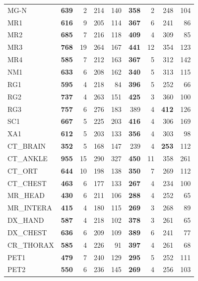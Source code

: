 \documentclass[journal]{IEEEtran}
\begin{document}
\begin{table}[htbp]
\begin{tabular}{l|rrrr|rrrr}
MG-N           & \textbf{639} & 2 & 214 & 140 & \textbf{358} & 2 & 248 & 104 \\
MR1            & \textbf{616} & 9 & 205 & 114 & \textbf{367} & 6 & 241 & 86 \\
MR2            & \textbf{685} & 7 & 216 & 118 & \textbf{409} & 4 & 309 & 85 \\
MR3            & \textbf{768} & 19 & 264 & 167 & \textbf{441} & 12 & 354 & 123 \\
MR4            & \textbf{585} & 7 & 212 & 163 & \textbf{367} & 5 & 312 & 142 \\
NM1            & \textbf{633} & 6 & 208 & 162 & \textbf{340} & 5 & 313 & 115 \\
RG1            & \textbf{595} & 4 & 218 & 84 & \textbf{396} & 5 & 252 & 66 \\
RG2            & \textbf{737} & 4 & 263 & 151 & \textbf{425} & 3 & 360 & 100 \\
RG3            & \textbf{757} & 6 & 276 & 183 & 389 & 4 & \textbf{412} & 126 \\
SC1            & \textbf{667} & 5 & 225 & 203 & \textbf{416} & 4 & 306 & 169 \\
XA1            & \textbf{612} & 5 & 203 & 133 & \textbf{356} & 4 & 303 & 98 \\
CT\_BRAIN      & \textbf{352} & 5 & 168 & 147 & 239 & 4 & \textbf{253} & 112 \\
CT\_ANKLE      & \textbf{955} & 15 & 290 & 327 & \textbf{450} & 11 & 358 & 261 \\
CT\_ORT        & \textbf{644} & 10 & 198 & 138 & \textbf{350} & 7 & 269 & 112 \\
CT\_CHEST      & \textbf{463} & 6 & 177 & 133 & \textbf{267} & 4 & 234 & 100 \\
MR\_HEAD       & \textbf{430} & 6 & 211 & 106 & \textbf{288} & 4 & 252 & 65 \\
MR\_INTERA     & \textbf{415} & 4 & 180 & 115 & \textbf{269} & 3 & 268 & 89 \\
DX\_HAND       & \textbf{587} & 4 & 218 & 102 & \textbf{378} & 3 & 261 & 65 \\
DX\_CHEST      & \textbf{636} & 6 & 209 & 109 & \textbf{389} & 6 & 241 & 77 \\
CR\_THORAX     & \textbf{585} & 4 & 226 & 91 & \textbf{397} & 4 & 261 & 68 \\
PET1           & \textbf{479} & 7 & 240 & 129 & \textbf{295} & 5 & 252 & 111 \\
PET2           & \textbf{550} & 6 & 236 & 145 & \textbf{269} & 4 & 256 & 103 \\

\end{tabular}
\end{table}
\end{document}
